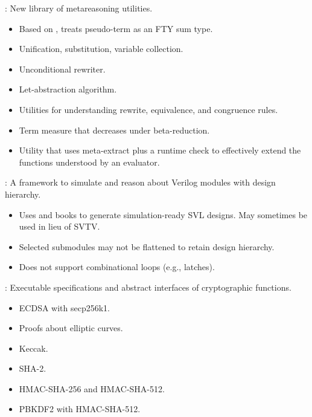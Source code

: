 
\begin{frame}

\newlibtitle

:
New library of metareasoning utilities.
\begin{itemize}
\item Based on , treats pseudo-term as an FTY sum type.
\item Unification, substitution, variable collection.
\item Unconditional rewriter.
\item Let-abstraction algorithm.
\item Utilities for understanding rewrite, equivalence, and congruence rules.
\item Term measure that decreases under beta-reduction.
\item Utility that uses meta-extract plus a runtime check to
  effectively extend the functions understood by an evaluator.
\end{itemize}

\end{frame}


\begin{frame}

\newlibtitle

:
A framework to simulate and reason about Verilog modules with design hierarchy.
\begin{itemize}
\item Uses  and  books to generate
  simulation-ready SVL designs. May sometimes be used in lieu of SVTV. 
\item Selected submodules may not be flattened to retain design hierarchy.
\item Does not support combinational loops (e.g., latches).
\end{itemize}

\end{frame}


\begin{frame}

\newlibtitle

:
Executable specifications and abstract interfaces of cryptographic functions.
\begin{itemize}
\item
ECDSA with secp256k1.
\item
Proofs about elliptic curves.
\item
Keccak.
\item
SHA-2.
\item
HMAC-SHA-256 and HMAC-SHA-512.
\item
PBKDF2 with HMAC-SHA-512.
\end{itemize}

\end{frame}

